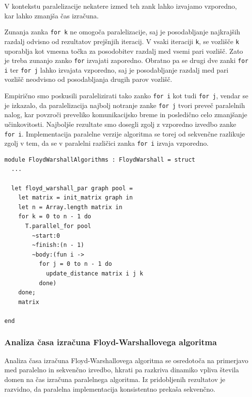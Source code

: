 \documentclass[mat1, tisk]{fmfdelo}
\begin{document}
V kontekstu paralelizacije nekatere izmed teh zank lahko izvajamo vzporedno, kar lahko zmanjša čas izračuna.

Zunanja zanka \texttt{for k} ne omogoča paralelizacije, saj je posodabljanje najkrajših razdalj odvisno od rezultatov
prejšnjih iteracij. V vsaki iteraciji \texttt{k}, se vozlišče \texttt{k} uporablja kot vmesna točka za posodobitev
razdalj med vsemi pari vozlišč. Zato je treba zunanjo zanko \texttt{for} izvajati zaporedno.
Obratno pa se drugi dve zanki \texttt{for i} ter \texttt{for j} lahko izvajata vzporedno, saj je posodabljanje razdalj med pari vozlišč
neodvisno od posodabljanja drugih parov vozlišč.

Empirično smo poskusili paralelizirati tako zanko \texttt{for i} kot tudi \texttt{for j}, vendar se je izkazalo, da paralelizacija najbolj
notranje zanke \texttt{for j} tvori preveč paralelnih nalog, kar povzroči preveliko komunikacijsko breme in posledično
celo zmanjšanje učinkovitosti. Najboljše rezultate smo dosegli zgolj z vzporedno izvedbo zanke \texttt{for i}.
Implementacija paralelne verzije algoritma se torej od sekvenčne razlikuje zgolj v tem, da se v paralelni različici
zanka \texttt{for i} izvaja vzporedno.

\begin{lstlisting}
module FloydWarshallAlgorithms : FloydWarshall = struct
  ...

  let floyd_warshall_par graph pool =
    let matrix = init_matrix graph in
    let n = Array.length matrix in
    for k = 0 to n - 1 do
      T.parallel_for pool 
        ~start:0 
        ~finish:(n - 1) 
        ~body:(fun i ->
          for j = 0 to n - 1 do
            update_distance matrix i j k
          done)
    done;
    matrix

end
\end{lstlisting}

\subsubsection{Analiza časa izračuna Floyd-Warshallovega algoritma}

Analiza časa izračuna Floyd-Warshallovega algoritma se osredotoča na primerjavo med paralelno in sekvenčno izvedbo, hkrati pa razkriva
dinamiko vpliva števila domen na čas izračuna paralelnega algoritma. Iz pridobljenih rezultatov je razvidno, da paralelna implementacija
konsistentno prekaša sekvenčno.
\end{document}
